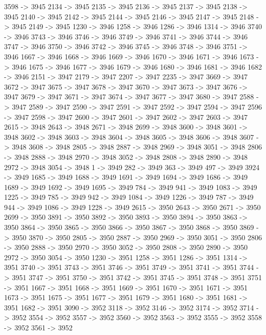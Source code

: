 {	3598 -> 3945
	2134 -> 3945
	2135 -> 3945
	2136 -> 3945
	2137 -> 3945
	2138 -> 3945
	2140 -> 3945
	2142 -> 3945
	2144 -> 3945
	2146 -> 3945
	2147 -> 3945
	2148 -> 3945
	2149 -> 3945
	1230 -> 3946
	1258 -> 3946
	1286 -> 3946
	1314 -> 3946
	3740 -> 3946
	3743 -> 3946
	3746 -> 3946
	3749 -> 3946
	3741 -> 3946
	3744 -> 3946
	3747 -> 3946
	3750 -> 3946
	3742 -> 3946
	3745 -> 3946
	3748 -> 3946
	3751 -> 3946
	1667 -> 3946
	1668 -> 3946
	1669 -> 3946
	1670 -> 3946
	1671 -> 3946
	1673 -> 3946
	1675 -> 3946
	1677 -> 3946
	1679 -> 3946
	1680 -> 3946
	1681 -> 3946
	1682 -> 3946
	2151 -> 3947
	2179 -> 3947
	2207 -> 3947
	2235 -> 3947
	3669 -> 3947
	3672 -> 3947
	3675 -> 3947
	3678 -> 3947
	3670 -> 3947
	3673 -> 3947
	3676 -> 3947
	3679 -> 3947
	3671 -> 3947
	3674 -> 3947
	3677 -> 3947
	3680 -> 3947
	2588 -> 3947
	2589 -> 3947
	2590 -> 3947
	2591 -> 3947
	2592 -> 3947
	2594 -> 3947
	2596 -> 3947
	2598 -> 3947
	2600 -> 3947
	2601 -> 3947
	2602 -> 3947
	2603 -> 3947
	2615 -> 3948
	2643 -> 3948
	2671 -> 3948
	2699 -> 3948
	3600 -> 3948
	3601 -> 3948
	3602 -> 3948
	3603 -> 3948
	3604 -> 3948
	3605 -> 3948
	3606 -> 3948
	3607 -> 3948
	3608 -> 3948
	2805 -> 3948
	2887 -> 3948
	2969 -> 3948
	3051 -> 3948
	2806 -> 3948
	2888 -> 3948
	2970 -> 3948
	3052 -> 3948
	2808 -> 3948
	2890 -> 3948
	2972 -> 3948
	3054 -> 3948
	1 -> 3949
	282 -> 3949
	363 -> 3949
	497 -> 3949
	3924 -> 3949
	1685 -> 3949
	1688 -> 3949
	1691 -> 3949
	1694 -> 3949
	1686 -> 3949
	1689 -> 3949
	1692 -> 3949
	1695 -> 3949
	784 -> 3949
	941 -> 3949
	1083 -> 3949
	1225 -> 3949
	785 -> 3949
	942 -> 3949
	1084 -> 3949
	1226 -> 3949
	787 -> 3949
	944 -> 3949
	1086 -> 3949
	1228 -> 3949
	2615 -> 3950
	2643 -> 3950
	2671 -> 3950
	2699 -> 3950
	3891 -> 3950
	3892 -> 3950
	3893 -> 3950
	3894 -> 3950
	3863 -> 3950
	3864 -> 3950
	3865 -> 3950
	3866 -> 3950
	3867 -> 3950
	3868 -> 3950
	3869 -> 3950
	3870 -> 3950
	2805 -> 3950
	2887 -> 3950
	2969 -> 3950
	3051 -> 3950
	2806 -> 3950
	2888 -> 3950
	2970 -> 3950
	3052 -> 3950
	2808 -> 3950
	2890 -> 3950
	2972 -> 3950
	3054 -> 3950
	1230 -> 3951
	1258 -> 3951
	1286 -> 3951
	1314 -> 3951
	3740 -> 3951
	3743 -> 3951
	3746 -> 3951
	3749 -> 3951
	3741 -> 3951
	3744 -> 3951
	3747 -> 3951
	3750 -> 3951
	3742 -> 3951
	3745 -> 3951
	3748 -> 3951
	3751 -> 3951
	1667 -> 3951
	1668 -> 3951
	1669 -> 3951
	1670 -> 3951
	1671 -> 3951
	1673 -> 3951
	1675 -> 3951
	1677 -> 3951
	1679 -> 3951
	1680 -> 3951
	1681 -> 3951
	1682 -> 3951
	3090 -> 3952
	3118 -> 3952
	3146 -> 3952
	3174 -> 3952
	3714 -> 3952
	3554 -> 3952
	3557 -> 3952
	3560 -> 3952
	3563 -> 3952
	3555 -> 3952
	3558 -> 3952
	3561 -> 3952
}
